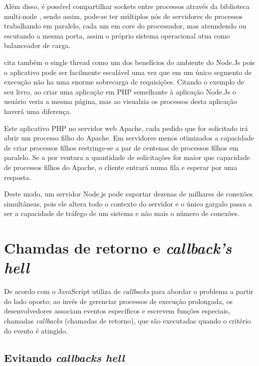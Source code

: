   
  Além disso, é possível compartilhar sockets entre processos através da biblioteca multi-node ,
  sendo assim, pode-se ter múltiplos nós de servidores de processos trabalhando em paralelo, 
  cada um em core do processador, mas atenndendo ou escutando a mesma porta, assim o próprio sistema operacional
  atua como balanceador de carga.\cite{Junior:2012}
  
  \cite{Powers:2012} cita também o single thread como um dos benefícios do ambiente do Node.Js 
  pois o aplicativo pode ser facilmente escalável uma vez que em um único segmento de execução não ha uma enorme 
  sobrecarga de requisições. Citando o exemplo de seu livro, ao criar uma aplicação em \ac{PHP} semelhante 
  à aplicação Node.Js o usuário veria a mesma página, mas ao visualzia os processos desta aplicação haverá uma 
  diferença.
  
  Este aplicativo \ac{PHP} no servidor web Apache, cada pedido que for solicitado irá abrir um 
  processo filho do Apache. Em servidores menos otimizados a capacidade de criar processos filhos
  restringe-se a par de centenas de processos filhos em paralelo. Se a por ventura a quantidade de solicitações
  for maior que capacidade de processos filhos do Apache, o cliente entrará numa fila e esperar por uma resposta.\cite{Powers:2012}
  
  Deste modo, um servidor Node.js pode suportar dezenas de milhares de conexões simultâneas, 
  pois ele altera todo o contexto do servidor e o único gargalo passa a ser a capacidade de tráfego 
  de um sistema e não mais o número de conexões.\cite{Abernethy:2011}
  
\section{Chamdas de retorno e \textit{callback's hell}}
\label{chamadas-de-retorno-e-callback-hell}

  De acordo com  o JavaScript utiliza de \textit{callbacks}
  para abordar o problema a  partir do lado oposto; ao invés de gerenciar processos de execução prolongada, 
  os desenvolvedores associam eventos específicos e escrevem funções especiais, chamadas \textit{callbacks}
  (chamadas de retorno), que são executadas quando o critério do evento é atingido.

\subsection{Evitando \textit{callbacks hell}}

